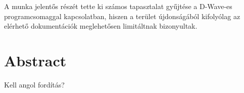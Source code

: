 A munka jelentős részét tette ki számos tapasztalat gyűjtése a D-Wave-es programcsomaggal kapcsolatban, hiszen a terület újdonságából kifolyólag az elérhető dokumentációk meglehetősen limitáltnak bizonyultak.

\vfill
\selectenglish


\chapter*{Abstract}

Kell angol fordítás?


\vfill
\selectthesislanguage

\setcounter{romanPage}{\value{page}}

